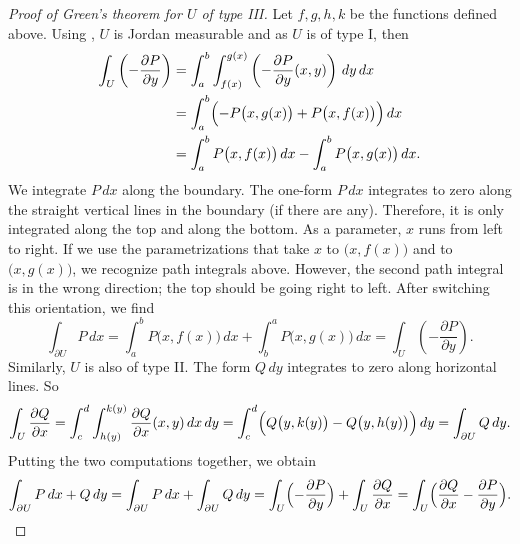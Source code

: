\begin{proof}[Proof of Green's theorem for $U$ of type III]
Let $f,g,h,k$ be the functions defined above.
Using ,
$U$ is Jordan measurable and as $U$ is of type I\@, then
\begin{equation*}
\begin{split}
\int_U 
\left(- \frac{\partial P}{\partial y} \right)
& =
\int_a^b \int_{f(x)}^{g(x)}
\left(- \frac{\partial P}{\partial y} (x,y) \right)
\, dy \, dx 
\\
& =
\int_a^b \Bigl(
- P\bigl(x,g(x)\bigr) +
P\bigl(x,f(x)\bigr)
\Bigr) \, dx
\\
& =
\int_a^b P\bigl(x,f(x)\bigr) \, dx 
-
\int_a^b P\bigl(x,g(x)\bigr) \, dx .
\end{split}
\end{equation*}
We integrate $P\,dx$ along the boundary.
The one-form $P\,dx$ integrates to zero 
along the straight vertical lines in the boundary (if there are any).
Therefore, it is only
integrated along the top and along the bottom.  As a parameter,
$x$ runs from left to right.  If we use the parametrizations that take $x$
to $\bigl(x,f(x)\bigr)$ and to
$\bigl(x,g(x)\bigr)$, we recognize path integrals above.  However, the second
path integral is in the wrong direction; the top should be going right to
left.  After switching this orientation, we find
\begin{equation*}
\int_{\partial U} P \, dx
=
\int_a^b P\bigl(x,f(x)\bigr) \, dx 
+
\int_b^a P\bigl(x,g(x)\bigr) \, dx
=
\int_U 
\left(- \frac{\partial P}{\partial y} \right) .
\end{equation*}
Similarly, $U$ is also of type II\@.  The form $Q\,dy$ integrates to zero along
horizontal lines.   So
\begin{equation*}
\int_U 
\frac{\partial Q}{\partial x}
=
\int_c^d \int_{h(y)}^{k(y)}
\frac{\partial Q}{\partial x}(x,y)
\, dx \, dy 
=
\int_c^d \Bigl(
Q\bigl(y,k(y)\bigr) 
-
Q\bigl(y,h(y)\bigr)
\Bigr) \, dy 
=
\int_{\partial U} Q \, dy .
\end{equation*}
Putting the two computations together, we obtain
\begin{equation*}
\int_{\partial U} P\, dx + Q \, dy 
=
\int_{\partial U} P\, dx + \int_{\partial U} Q \, dy 
=
\int_U 
\Bigl(-\frac{\partial P}{\partial y}\Bigr)
+
\int_U 
\frac{\partial Q}{\partial x}
=
\int_U 
\Bigl(
\frac{\partial Q}{\partial x}
-\frac{\partial P}{\partial y}
\Bigr) . \qedhere
\end{equation*}
\end{proof}

